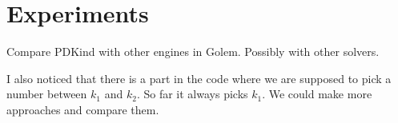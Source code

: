 \chapter{Experiments}

Compare PDKind with other engines in Golem. Possibly with other solvers. \newline

I also noticed that there is a part in the code where we are supposed to pick a number between $k_1$ and $k_2$. So far it always picks $k_1$. We could make more approaches and compare them. 
